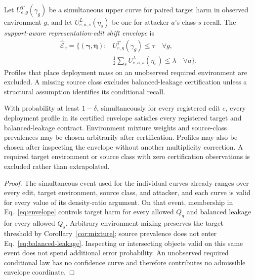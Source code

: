 Let $U^T_{e,g}(\gamma_g)$ be a simultaneous upper curve for paired target harm
in observed environment $g$, and let $U^L_{e,a,s}(\eta_s)$ be one for attacker
$a$'s class-$s$ recall. The \emph{support-aware representation-edit shift envelope} is
\begin{equation}
\begin{split}
 \widehat{\mathcal E}_e=\{(\boldsymbol\gamma,\boldsymbol\eta):
 &U^T_{e,g}(\gamma_g)\leq\tau\quad\forall g,\\
 &\tfrac12\textstyle\sum_s U^L_{e,a,s}(\eta_s)\leq\lambda
 \quad\forall a\}.
 \label{eq:envelope}
\end{split}
\end{equation}
Profiles that place deployment mass on an unobserved required environment are
excluded. A missing source class excludes balanced-leakage certification
unless a structural assumption identifies its conditional recall.

\begin{theorem}
\label{thm:shift-envelope}
With probability at least $1-\delta$, simultaneously for every registered edit
$e$, every deployment profile in its certified envelope satisfies every
registered target and balanced-leakage contract. Environment mixture weights
and source-class prevalences may be chosen arbitrarily after certification.
Profiles may also be chosen after inspecting the envelope without another
multiplicity correction. A required target environment or source class with
zero certification observations is excluded rather than extrapolated.
\end{theorem}

\begin{proof}
The simultaneous event used for the individual curves already ranges over
every edit, target environment, source class, and attacker, and each curve is
valid for every value of its density-ratio argument. On that event, membership
in Eq.~\eqref{eq:envelope} controls target harm for every allowed $Q_g$ and
balanced leakage for every allowed $Q_s$. Arbitrary environment mixing
preserves the target threshold by Corollary~\ref{cor:mixture}; source prevalence
does not enter Eq.~\eqref{eq:balanced-leakage}. Inspecting or intersecting
objects valid on this same event does not spend additional error probability.
An unobserved required conditional law has no confidence curve and therefore
contributes no admissible envelope coordinate.
\end{proof}

